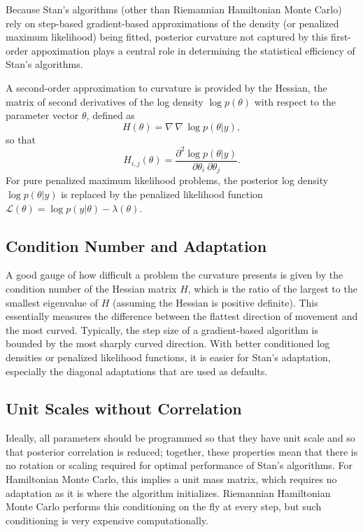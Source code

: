 Because Stan's algorithms (other than Riemannian Hamiltonian Monte
Carlo) rely on step-based gradient-based approximations of the density
(or penalized maximum likelihood) being fitted, posterior curvature
not captured by this first-order appoximation plays a central role in
determining the statistical efficiency of Stan's algorithms.

A second-order approximation to curvature is provided by the
Hessian, the matrix of second derivatives of the log density $\log
p(\theta)$ with respect to the parameter vector $\theta$, defined
as
\[
H(\theta) = \nabla \, \nabla \, \log p(\theta | y),
\]
so that
\[
H_{i, j}(\theta) = \frac{\partial^2 \log p(\theta | y)}
                {\partial \theta_i \ \partial \theta_j}.
\]
For pure penalized maximum likelihood problems, the posterior log
density $\log p(\theta | y)$ is replaced by the penalized likelihood
function $\mathcal{L}(\theta) = \log p(y | \theta) - \lambda(\theta)$.

\subsection{Condition Number and Adaptation}

A good gauge of how difficult a problem the curvature presents is
given by the condition number of the Hessian matrix $H$, which is the
ratio of the largest to the smallest eigenvalue of $H$ (assuming the
Hessian is positive definite).  This essentially measures the
difference between the flattest direction of movement and the most
curved.  Typically, the step size of a gradient-based algorithm is
bounded by the most sharply curved direction.  With better conditioned
log densities or penalized likelihood functions, it is easier for
Stan's adaptation, especially the diagonal adaptations that are used
as defaults.

\subsection{Unit Scales without Correlation}

Ideally, all parameters should be programmed so that they have unit
scale and so that posterior correlation is reduced; together, these
properties mean that there is no rotation or scaling required for
optimal performance of Stan's algorithms.  For Hamiltonian Monte
Carlo, this implies a unit mass matrix, which requires no adaptation
as it is where the algorithm initializes.  Riemannian Hamiltonian
Monte Carlo performs this conditioning on the fly at every step, but
such conditioning is very expensive computationally.

